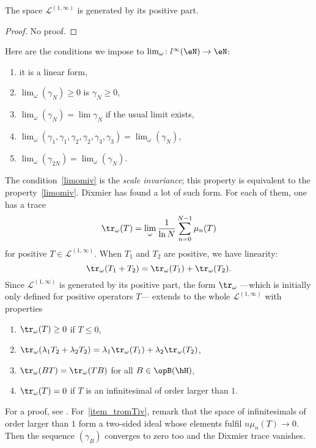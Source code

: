 \begin{proposition}
The space $\mathscr{L}^{(1,\infty)}$ is generated by its positive part.
\end{proposition}
\begin{proof}
No proof.
\end{proof}
Here are the conditions we impose to $\lim_{\omega}\colon l^{\infty}(\eN)\to \eN$:
\begin{enumerate}
\item it is a linear form,
\item $\lim_{\omega}(\gamma_N)\geq 0$ is $\gamma_N\geq0$,
\item $\lim_{\omega}(\gamma_N)=\lim\gamma_N$ if the usual limit exists,
\item\label{limomiii}$\lim_{\omega}(\gamma_1,\gamma_1,\gamma_2,\gamma_2,\gamma_3,\gamma_3)=\lim_{\omega}(\gamma_N)$,
\item\label{limomiv} $\lim_{\omega}(\gamma_{2N})=\lim_{\omega}(\gamma_N)$.
\end{enumerate}
The condition~\ref{limomiv} is the \emph{scale invariance}; this property is equivalent to the property~\ref{limomiv}. Dixmier has found a lot of such form. For each of them, one has a trace
\begin{equation}
   \tr_{\omega}(T)=\lim_{\omega}\frac{1}{ \ln N }\sum_{n=0}^{N-1}\mu_n(T)
\end{equation}
for positive $T\in\mathscr{L}^{(1,\infty)}$. When $T_1$ and $T_2$ are positive, we have linearity:
\[
  \tr_{\omega}(T_1+T_2)=\tr_{\omega}(T_1)+\tr_{\omega}(T_2).
\]
Since $\mathscr{L}^{(1,\infty)}$ is generated by its positive part, the form $\tr_{\omega}$ ---which is initially only defined for positive operators $T$--- extends to the whole $\mathscr{L}^{(1,\infty)}$ with properties
\begin{enumerate}
\item $\tr_{\omega}(T)\geq0$ if $T\leq0$,
\item $\tr_{\omega}(\lambda_1T_2+\lambda_2 T_2)=\lambda_1\tr_{\omega}(T_1)+\lambda_2\tr_{\omega}(T_2)$,
\item $\tr_{\omega}(BT)=\tr_{\omega}(TB)$ for all $B\in\opB(\hH)$,
\item\label{item_tromTiv} $\tr_{\omega}(T)=0$ if $T$ is an infinitesimal of order larger than $1$.
\end{enumerate}
For a proof, see \cite{Landi}. For~\ref{item_tromTiv}, remark that the space of infinitesimals of order larger than $1$ form a two-sided ideal whose elements fulfil $n\mu_n(T)\to 0$. Then the sequence $(\gamma_B)$ converges to zero too and the Dixmier trace vanishes.


